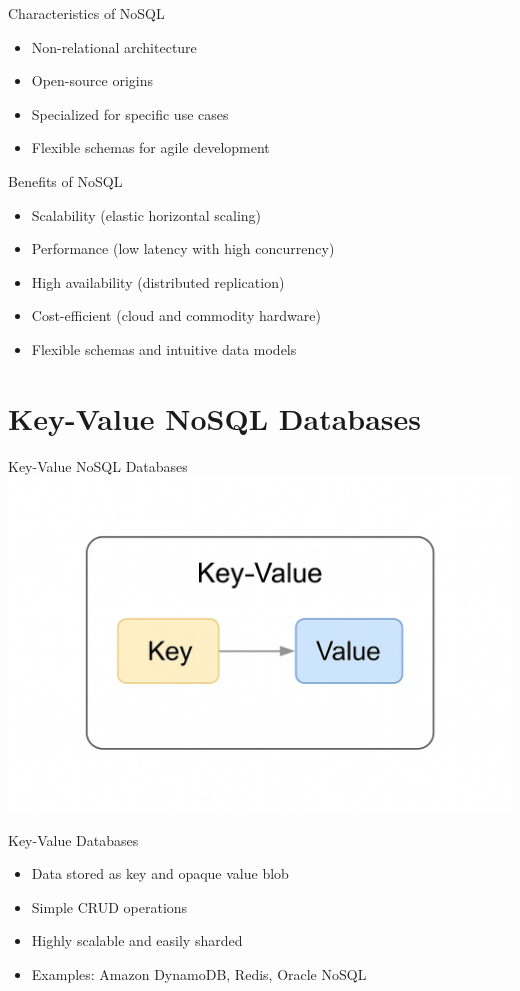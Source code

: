 \documentclass[aspectratio=169]{beamer}
\begin{document}
\begin{frame}{Characteristics of NoSQL}
\begin{itemize}
    \item Non-relational architecture
    \item Open-source origins
    \item Specialized for specific use cases
    \item Flexible schemas for agile development
\end{itemize}
\end{frame}

\begin{frame}{Benefits of NoSQL}
\begin{itemize}
    \item Scalability (elastic horizontal scaling)
    \item Performance (low latency with high concurrency)
    \item High availability (distributed replication)
    \item Cost-efficient (cloud and commodity hardware)
    \item Flexible schemas and intuitive data models
\end{itemize}
\end{frame}

\section{Key-Value NoSQL Databases}

\begin{frame}{\centering Key-Value NoSQL Databases}
\centering
\includegraphics[width=0.6\linewidth]{figures/key_value_diagram}
\end{frame}

\begin{frame}{Key-Value Databases}
\begin{itemize}
    \item Data stored as key and opaque value blob
    \item Simple CRUD operations
    \item Highly scalable and easily sharded
    \item Examples: Amazon DynamoDB, Redis, Oracle NoSQL
\end{itemize}
\end{frame}
\end{document}
